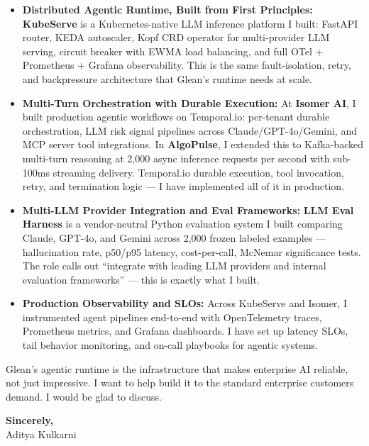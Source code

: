 \documentclass[11pt,letterpaper]{article}
\begin{document}
\vspace{4pt}
\begin{itemize}[leftmargin=*, itemsep=3pt, label={\color{GleanBlue}\faAngleRight}]
    \item \textbf{Distributed Agentic Runtime, Built from First Principles:} \textbf{KubeServe} is a Kubernetes-native LLM inference platform I built: FastAPI router, KEDA autoscaler, Kopf CRD operator for multi-provider LLM serving, circuit breaker with EWMA load balancing, and full OTel + Prometheus + Grafana observability. This is the same fault-isolation, retry, and backpressure architecture that Glean's runtime needs at scale.

    \item \textbf{Multi-Turn Orchestration with Durable Execution:} At \textbf{Isomer AI}, I built production agentic workflows on Temporal.io: per-tenant durable orchestration, LLM risk signal pipelines across Claude/GPT-4o/Gemini, and MCP server tool integrations. In \textbf{AlgoPulse}, I extended this to Kafka-backed multi-turn reasoning at 2,000 async inference requests per second with sub-100ms streaming delivery. Temporal.io durable execution, tool invocation, retry, and termination logic --- I have implemented all of it in production.

    \item \textbf{Multi-LLM Provider Integration and Eval Frameworks:} \textbf{LLM Eval Harness} is a vendor-neutral Python evaluation system I built comparing Claude, GPT-4o, and Gemini across 2,000 frozen labeled examples --- hallucination rate, p50/p95 latency, cost-per-call, McNemar significance tests. The role calls out ``integrate with leading LLM providers and internal evaluation frameworks'' --- this is exactly what I built.

    \item \textbf{Production Observability and SLOs:} Across KubeServe and Isomer, I instrumented agent pipelines end-to-end with OpenTelemetry traces, Prometheus metrics, and Grafana dashboards. I have set up latency SLOs, tail behavior monitoring, and on-call playbooks for agentic systems.
\end{itemize}
\vspace{6pt}

Glean's agentic runtime is the infrastructure that makes enterprise AI reliable, not just impressive. I want to help build it to the standard enterprise customers demand. I would be glad to discuss.

\vspace{12pt}
\textbf{Sincerely,}\\[8pt]
Aditya Kulkarni
\end{document}

